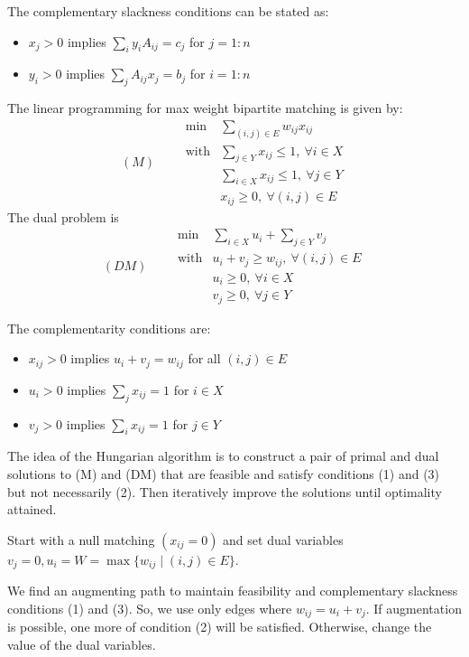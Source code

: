 The complementary slackness conditions can be stated as:
\begin{itemize}
\item
$x_j>0$ implies $\sum_iy_iA_{ij}=c_j$ for $j=1:n$
\item
$y_i>0$ implies $\sum_jA_{ij}x_j=b_j$ for $i=1:n$ 
\end{itemize}

The linear programming for max weight bipartite matching is given by:
\[(M)\qquad
\begin{array}{ll}
\min&\sum_{(i,j)\in E}w_{ij}x_{ij}\\
\text{with}&\sum_{j\in Y}x_{ij}\le 1,\ \forall i\in X\\
&\sum_{i\in X}x_{ij}\le 1,\ \forall j\in Y\\
&x_{ij}\ge0,\ \forall(i,j)\in E
\end{array}
\]
The dual problem is
\[(DM)\qquad
\begin{array}{ll}
\min&\sum_{i\in X}u_i+\sum_{j\in Y}v_j\\
\text{with}&u_i+v_j\ge w_{ij},\ \forall(i,j)\in E\\
&u_i\ge0,\ \forall i\in X\\
&v_j\ge0,\ \forall j\in Y
\end{array}
\]

The complementarity conditions are:
\begin{itemize}
\item
$x_{ij}>0$ implies $u_i+v_j=w_{ij}$ for all $(i,j)\in E$
\item
$u_i>0$ implies $\sum_jx_{ij}=1$ for $i\in X$
\item
$v_j>0$ implies $\sum_ix_{ij}=1$ for $j\in Y$
\end{itemize}
The idea of the Hungarian algorithm is to construct a pair of primal and dual solutions to (M) and (DM) that are feasible and satisfy conditions (1) and (3) but not necessarily (2). Then iteratively improve the solutions until optimality attained.

Start with a null matching $(x_{ij}=0)$ and set dual variables $v_j=0,u_i=W=\max\{w_{ij}\mid (i,j)\in E\}$.

We find an augmenting path to maintain feasibility and complementary slackness conditions (1) and (3). So, we use only edges where $w_{ij}=u_i+v_j$. 
If augmentation is possible, one more of condition (2) will be satisfied.
Otherwise,  change the value of the dual variables.


